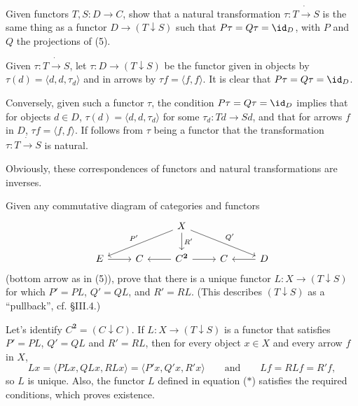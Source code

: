 \begin{exercise}[S. A. Huq]
Given functors $T,S:D\to C$, show that a natural transformation $\tau:T\dot{\to} S$ is the same thing as a functor $D\to (T\downarrow S)$ such that $P\tau=Q\tau=\id_D$, with $P$ and $Q$ the projections of (5).
\end{exercise}
\begin{solution}
Given $\tau:T\dot{\to} S$, let $\tau:D\to(T\downarrow S)$ be the functor given in objects by $\tau(d)=\langle d,d,\tau_d\rangle$ and in arrows by $\tau f=\langle f,f\rangle$. It is clear that $P\tau=Q\tau=\id_D$.

Conversely, given such a functor $\tau$, the condition $P\tau=Q\tau=\id_D$ implies that for objects $d\in D$, $\tau(d)=\langle d, d, \tau_d\rangle$ for some $\tau_d:Td\to Sd$, and that for arrows $f$ in $D$, $\tau f=\langle f,f\rangle$. If follows from $\tau$ being a functor that the transformation $\tau:T\dot{\to}S$ is natural.

Obviously, these correspondences of functors and natural transformations are inverses.
\end{solution}

\begin{exercise}
Given any commutative diagram of categories and functors
\vspace{-5pt}\[\begin{tikzcd}
&&X \arrow[lld, "P'", swap] \arrow[d,"R'"] \arrow[rrd,"Q'"]\\
E \arrow[r]
&C
&C^\mathbf{2} \arrow[l]\arrow[r]
&C
&D \arrow[l]
\end{tikzcd}\vspace{-5pt}\]
(bottom arrow as in (5)), prove that there is a unique functor $L:X\to(T\downarrow S)$ for which $P'=PL$, $Q'=QL$, and $R'=RL$. (This describes $(T\downarrow S)$ as a ``pullback'', cf. \S III.4.)
\end{exercise}
\begin{solution}
Let's identify $C^\mathbf{2}=(C\downarrow C)$. If $L:X\to(T\downarrow S)$ is a functor that satisfies $P'=PL$, $Q'=QL$ and $R'=RL$, then for every object $x\in X$ and every arrow $f$ in $X$,
\begin{equation*}
Lx=\langle PLx,QLx,RLx\rangle=\langle P'x,Q'x,R'x\rangle\qquad\text{and}\qquad Lf=RLf=R'f,\tag{$*$}
\end{equation*}
so $L$ is unique. Also, the functor $L$ defined in equation ($*$) satisfies the required conditions, which proves existence.
\end{solution}

